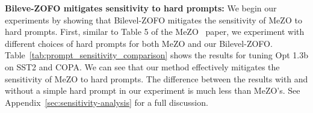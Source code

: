\textbf{Bileve-ZOFO mitigates sensitivity to hard prompts:} 
We begin our experiments by showing that Bilevel-ZOFO mitigates the sensitivity of MeZO to hard prompts. First, similar to Table 5 of the MeZO~\cite{MalladiGNDL0A23Mezo} paper, we experiment with different choices of hard prompts for both MeZO and our Bilevel-ZOFO. Table~\ref{tab:prompt_sensitivity_comparison} shows the results for tuning Opt 1.3b on SST2 and COPA. We can see that our method effectively mitigates the sensitivity of MeZO to hard prompts. The difference between the results with and without a simple hard prompt in our experiment is much less than MeZO's. See Appendix~\ref{sec:sensitivity-analysis} for a full discussion.


\begin{table}[!t]
\centering
{}
\caption{Prompt Sensitivity Comparison for MeZO and Bilevel-ZOFO. Bilevel-ZOFO effectively mitigates the sensitivity of MeZO to hard prompts.}
\label{tab:prompt_sensitivity_comparison}
\end{table}

